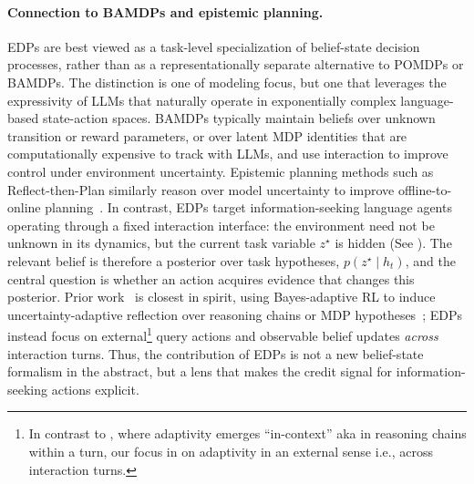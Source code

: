\documentclass[11pt]{article}
\theoremstyle{plain}
\theoremstyle{definition}
\theoremstyle{remark}
\begin{document}
\paragraph{Connection to BAMDPs and epistemic planning.}
    EDPs are best viewed as a task-level specialization of belief-state decision processes, rather than as a representationally separate alternative to POMDPs or BAMDPs. The distinction is one of modeling focus, but one that leverages the expressivity of LLMs that naturally  operate in exponentially complex language-based state-action spaces. BAMDPs typically maintain beliefs over unknown transition or reward parameters, or over latent MDP identities that are computationally expensive to track with LLMs, and use interaction to improve control under environment uncertainty. Epistemic planning methods such as Reflect-then-Plan similarly reason over model uncertainty to improve offline-to-online planning~\citep{jeong2025reflectthenplan}. In contrast, EDPs target information-seeking language agents operating through a fixed interaction interface: the environment need not be unknown in its dynamics, but the current task variable \(z^\star\) is hidden (See ). The relevant belief is therefore a posterior over task hypotheses, \(p(z^\star \mid h_t)\), and the central question is whether an action acquires evidence that changes this posterior. Prior work~\citep{zhang2025markovianreflectiveexplorationbayesadaptive} is closest in spirit, using Bayes-adaptive RL to induce uncertainty-adaptive reflection over reasoning chains or MDP hypotheses~\citep{zhang2025markovianreflectiveexplorationbayesadaptive}; EDPs instead focus on external\footnote{In contrast to \citep{zhang2025markovianreflectiveexplorationbayesadaptive}, where adaptivity emerges “in-context” aka in reasoning chains within a turn, our focus in on adaptivity in an external sense i.e., across interaction turns.} query actions and observable belief updates \textit{across} interaction turns. Thus, the contribution of EDPs is not a new belief-state formalism in the abstract, but a lens that makes the credit signal for information-seeking actions explicit.
 
\end{document}
